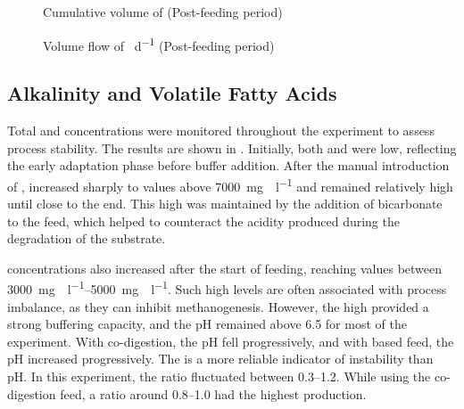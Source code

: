\documentclass[12pt, a4paper, oneside]{report}
\begin{document}
\begin{figure}[H]
    \centering
    \caption{Cumulative volume of  \unit{\nml} (Post-feeding period)}
    \label{graph:extra-accumulation}
\end{figure}

\begin{figure}[H]
    \centering
    \caption{Volume flow of  \unit{\nml\per\day} (Post-feeding period)}
    \label{graph:extra-flow}
\end{figure}

\subsection{Alkalinity and Volatile Fatty Acids}
\label{subsec:alkalinity_vfa}

Total  and  concentrations were monitored throughout the experiment to assess process stability. The results are shown in . Initially, both  and  were low, reflecting the early adaptation phase before buffer addition. After the manual introduction of ,  increased sharply to values above \qty{7000}{\milli\gram\CaCO\per\litre} and remained relatively high until close to the end. This high  was maintained by the addition of bicarbonate to the feed, which helped to counteract the acidity produced during the degradation of the substrate.

 concentrations also increased after the start of feeding, reaching values between \qtyrange{3000}{5000}{\milli\gram\CHCOOH\per\litre}. Such high  levels are often associated with process imbalance, as they can inhibit methanogenesis. However, the high  provided a strong buffering capacity, and the pH remained above \num{6.5} for most of the experiment. With co-digestion, the pH fell progressively, and with  based feed, the pH increased progressively. The  is a more reliable indicator of instability than pH. In this experiment, the ratio fluctuated between \numrange{0.3}{1.2}. While using the co-digestion feed, a ratio around \numrange{0.8}{1.0} had the highest production.
\end{document}
